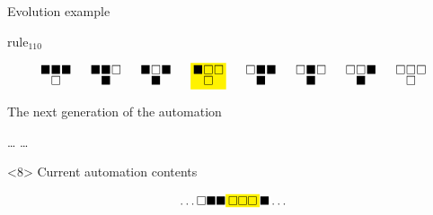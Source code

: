 \documentclass[presentation,aspectratio=169,smaller]{beamer}
\begin{document}
\begin{frame}[label={sec:org812e2ea},t]{Evolution example}
\begin{onlyenv}
\(\text{rule}_{110}\)

\begin{equation*}
  \begingroup
  \setlength\arraycolsep{0.25pt}
  \renewcommand{\arraystretch}{0.5}
  \begin{matrix}
    \blacksquare & \blacksquare & \blacksquare \\
    & \square &
  \end{matrix}\mspace{28mu}
  \begin{matrix}
    \blacksquare & \blacksquare & \square \\
    & \blacksquare &
  \end{matrix}\mspace{28mu}
  \begin{matrix}
    \blacksquare & \square & \blacksquare \\
    & \blacksquare &
  \end{matrix}\mspace{28mu}
  \mathcolorbox{yellow}{
    \begin{matrix}
      \blacksquare & \square & \square \\
      & \square &
    \end{matrix}
  }\mspace{28mu}
  \begin{matrix}
    \square & \blacksquare & \blacksquare \\
    & \blacksquare &
  \end{matrix}\mspace{28mu}
  \begin{matrix}
    \square & \blacksquare & \square \\
    & \blacksquare &
  \end{matrix}\mspace{28mu}
  \begin{matrix}
    \square & \square & \blacksquare \\
    & \blacksquare &
  \end{matrix}\mspace{28mu}
  \begin{matrix}
    \square & \square & \square \\
    & \square &
  \end{matrix}
  \endgroup
\end{equation*}

The next generation of the automation

\hfill \dots
\blacksquare
\blacksquare
\blacksquare
{}
\mspace{14mu}
\mspace{14mu}
\mspace{14mu}
\dots \hfill
\end{onlyenv}

\begin{onlyenv}<8>
Current automation contents

\begin{equation*}
  \hfill
  \dots
  \square
  \blacksquare
  \blacksquare
  \mathcolorbox{yellow}{
    \square
    \square
    \square
  }
  \blacksquare
  \dots
  \hfill
\end{equation*}


\end{onlyenv}
\end{frame}
\end{document}
